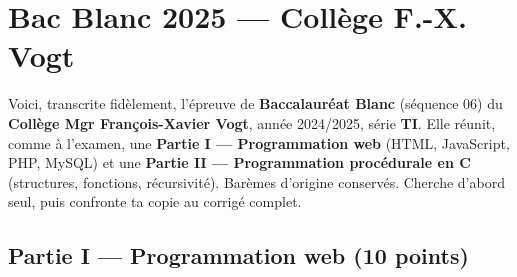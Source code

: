 \section{Bac Blanc 2025 — Collège F.-X. Vogt}

\begin{synthese}
Voici, transcrite fidèlement, l'épreuve de \textbf{Baccalauréat Blanc} (séquence 06)
du \textbf{Collège Mgr François-Xavier Vogt}, année 2024/2025, série \textbf{TI}.
Elle réunit, comme à l'examen, une \textbf{Partie I — Programmation web} (HTML,
JavaScript, PHP, MySQL) et une \textbf{Partie II — Programmation procédurale en C}
(structures, fonctions, récursivité). Barèmes d'origine conservés. Cherche d'abord
seul, puis confronte ta copie au corrigé complet.
\end{synthese}

\begin{center}
\end{center}

\subsection*{Partie I — Programmation web \hfill (10 points)}

